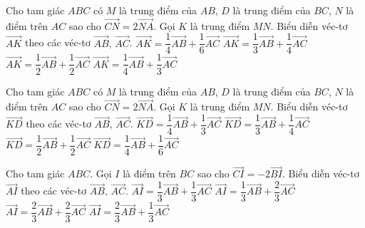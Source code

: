 \begin{ex}%
	Cho tam giác $ABC$ có $M$ là trung điểm của $AB$, $D$ là trung điểm của $BC$, $N$ là điểm trên $AC$ sao cho $\vec{CN}=2\vec{NA}$. Gọi $K$ là trung điểm $MN$. Biểu diễn véc-tơ $\vec{AK}$ theo các véc-tơ $\vec{AB},\,\vec{AC}$.
	\haicot
	{\True $\vec{AK}=\dfrac{1}{4}\vec{AB}+\dfrac{1}{6}\vec{AC}$}
	{$\vec{AK}=\dfrac{1}{3}\vec{AB}+\dfrac{1}{4}\vec{AC}$}
	{$\vec{AK}=\dfrac{1}{2}\vec{AB}+\dfrac{1}{2}\vec{AC}$}
	{$\vec{AK}=\dfrac{1}{4}\vec{AB}+\dfrac{1}{3}\vec{AC}$}
\end{ex}

\begin{ex}%
	Cho tam giác $ABC$ có $M$ là trung điểm của $AB$, $D$ là trung điểm của $BC$, $N$ là điểm trên $AC$ sao cho $\vec{CN}=2\vec{NA}$. Gọi $K$ là trung điểm $MN$. Biểu diễn véc-tơ $\vec{KD}$ theo các véc-tơ $\vec{AB},\,\vec{AC}$.
	\haicot
	{\True $\vec{KD}=\dfrac{1}{4}\vec{AB}+\dfrac{1}{3}\vec{AC}$}
	{$\vec{KD}=\dfrac{1}{3}\vec{AB}+\dfrac{1}{4}\vec{AC}$}
	{$\vec{KD}=\dfrac{1}{2}\vec{AB}+\dfrac{1}{2}\vec{AC}$}
	{$\vec{KD}=\dfrac{1}{4}\vec{AB}+\dfrac{1}{6}\vec{AC}$}
\end{ex}

\begin{ex}%
	Cho tam giác $ABC$. Gọi $I$ là điểm trên $BC$ sao cho $\vec{CI}=-2\vec{BI}$. Biểu diễn véc-tơ $\vec{AI}$ theo các véc-tơ $\vec{AB},\,\vec{AC}$.
	\haicot
	{$\vec{AI}=\dfrac{1}{3}\vec{AB}+\dfrac{1}{3}\vec{AC}$}
	{$\vec{AI}=\dfrac{1}{3}\vec{AB}+\dfrac{2}{3}\vec{AC}$}
	{$\vec{AI}=\dfrac{2}{3}\vec{AB}+\dfrac{2}{3}\vec{AC}$}
	{\True $\vec{AI}=\dfrac{2}{3}\vec{AB}+\dfrac{1}{3}\vec{AC}$}
\end{ex}


